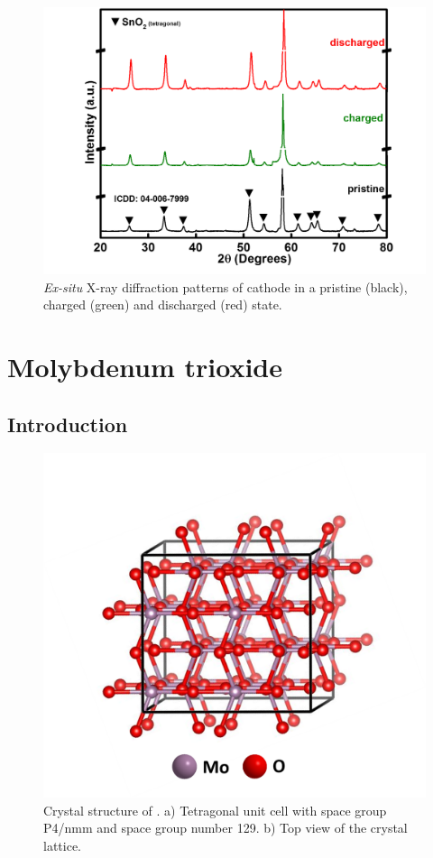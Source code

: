  \begin{figure}[th!]
  \centering
  \includegraphics[width=\textwidth]{Figures/chap6fig/SnO2XRD}
    \caption{\textit{Ex-situ} X-ray diffraction patterns of  cathode in a pristine (black), charged (green) and discharged (red) state.}
  \label{Figures/chap6fig:SnO2XRD}
\end{figure}


\section{Molybdenum trioxide}

\subsection{Introduction}

 \begin{figure}[th!]
  \centering
  \includegraphics[width=\textwidth]{Figures/chap6fig/MoO3crys}
    \caption{Crystal structure of . a) Tetragonal unit cell with space group P4/nmm and space group number 129. b) Top view of the crystal lattice.}
  \label{Figures/chap6fig:MoO3crys}
\end{figure}

